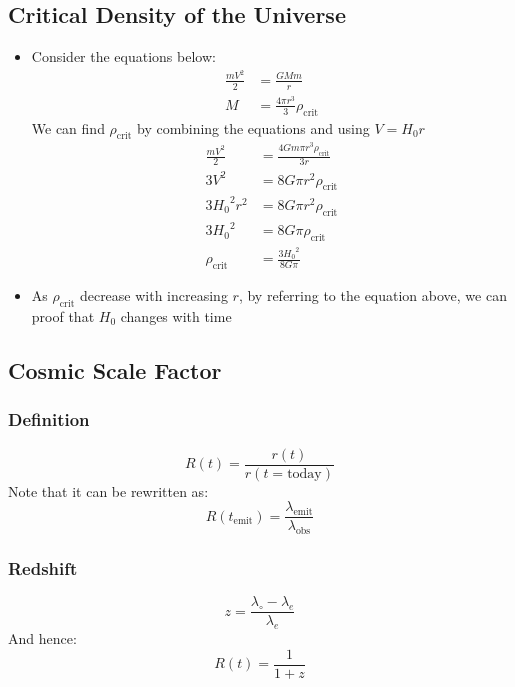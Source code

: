 \documentclass{article}
\begin{document}
\subsection{Critical Density of the Universe}
\begin{itemize}
    \item Consider the equations below:
    \begin{align}
        \frac{mV^2}{2}&=\frac{GMm}{r}\\
    M&=\frac{4 \pi r^3}{3} \rho_\text{crit}
    \end{align}
    We can find $\rho_\text{crit}$ by combining the equations and using $V=H_0r$
    \begin{align}
        \frac{mV^2}{2}&=\frac{4Gm\pi r^3 \rho_\text{crit}}{3r}\\
         3V^2&=8G\pi r^2 \rho_\text{crit}\\
         3{H_0}^2{r^2}&=8G\pi r^2 \rho_\text{crit}\\
          3{H_0}^2&=8G\pi\rho_\text{crit}\\
         \rho_\text{crit}&=\frac {3{H_0}^2}{8G\pi}
    \end{align}
    \item As $\rho_\text{crit}$ decrease with increasing $r$, by referring to the equation above, we can proof that $H_0$ changes with time
\end{itemize}
\subsection{Cosmic Scale Factor}
\subsubsection{Definition}
\begin{equation}
    R(t)=\frac{r(t)}{r(t=\text{today})}
    \end{equation}
    Note that it can be rewritten as:
\begin{equation}
    R(t_\text{emit})=\frac{\lambda_\text{emit}}{\lambda_\text{obs}}
\end{equation}
\subsubsection{Redshift}
\begin{equation}
z=\frac{\lambda_{\circ}-\lambda_e}{\lambda_e}
\end{equation}
And hence:
\begin{equation}
    R(t)=\frac{1}{1+z}
\end{equation}
\end{document}
